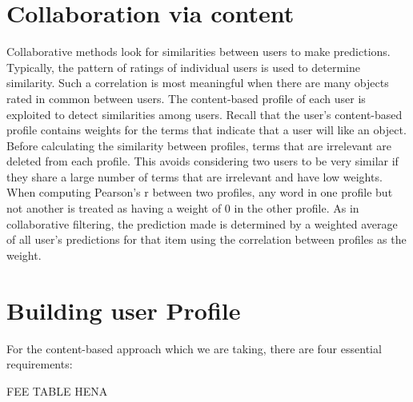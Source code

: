 \section{Collaboration via content}
Collaborative methods look for similarities between users to make predictions. Typically, the pattern of ratings of individual users is used to determine similarity. Such a correlation is most meaningful when there are many objects rated in common between users.
The content-based profile of each user is exploited to detect similarities among users. Recall that the user’s content-based profile contains weights for the terms that indicate that a user will like an object. Before calculating the similarity between profiles, terms that are irrelevant are deleted from each profile. This avoids considering two users to be very similar if they share a large number of terms that are irrelevant and have low weights. When computing Pearson’s r between two profiles, any word in one profile but not another is treated as having a weight of 0 in the other profile. As in collaborative filtering, the prediction made is determined by a weighted average of all user’s predictions for that item using the correlation between profiles as the weight.

\section{Building user Profile}
For the content-based approach which we are taking, there are four essential requirements:

FEE TABLE HENA

